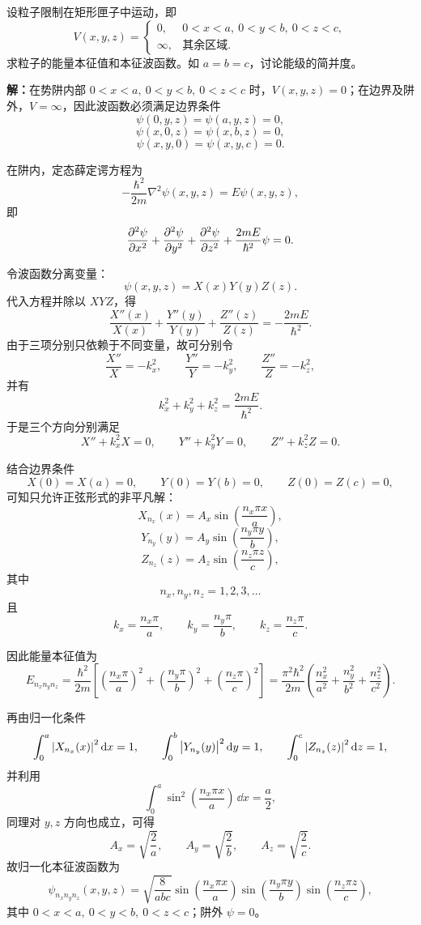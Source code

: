 \documentclass[12pt,a4paper]{article}
\begin{document}
\maketitle

\section{}
设粒子限制在矩形匣子中运动，即
\[
V(x,y,z)=
\begin{cases}
0, & 0<x<a,\ 0<y<b,\ 0<z<c,\\
\infty, & \text{其余区域}.
\end{cases}
\]
求粒子的能量本征值和本征波函数。如 $a=b=c$，讨论能级的简并度。

\vspace{0.5cm}

\noindent\textbf{解：}在势阱内部 $0<x<a,\ 0<y<b,\ 0<z<c$ 时，$V(x,y,z)=0$；在边界及阱外，$V=\infty$，因此波函数必须满足边界条件
\[
\psi(0,y,z)=\psi(a,y,z)=0,
\]
\[
\psi(x,0,z)=\psi(x,b,z)=0,
\]
\[
\psi(x,y,0)=\psi(x,y,c)=0.
\]

在阱内，定态薛定谔方程为
\[
-\frac{\hbar^2}{2m}\nabla^2\psi(x,y,z)=E\psi(x,y,z),
\]
即
\[
\pdv[2]{\psi}{x}+\pdv[2]{\psi}{y}+\pdv[2]{\psi}{z}+\frac{2mE}{\hbar^2}\psi=0.
\]

令波函数分离变量：
\[
\psi(x,y,z)=X(x)Y(y)Z(z).
\]
代入方程并除以 $XYZ$，得
\[
\frac{X''(x)}{X(x)}+\frac{Y''(y)}{Y(y)}+\frac{Z''(z)}{Z(z)}=-\frac{2mE}{\hbar^2}.
\]
由于三项分别只依赖于不同变量，故可分别令
\[
\frac{X''}{X}=-k_x^2,\qquad \frac{Y''}{Y}=-k_y^2,\qquad \frac{Z''}{Z}=-k_z^2,
\]
并有
\[
k_x^2+k_y^2+k_z^2=\frac{2mE}{\hbar^2}.
\]
于是三个方向分别满足
\[
X''+k_x^2X=0,\qquad Y''+k_y^2Y=0,\qquad Z''+k_z^2Z=0.
\]

结合边界条件
\[
X(0)=X(a)=0,\qquad Y(0)=Y(b)=0,\qquad Z(0)=Z(c)=0,
\]
可知只允许正弦形式的非平凡解：
\[
X_{n_x}(x)=A_x\sin\left(\frac{n_x\pi x}{a}\right),
\]
\[
Y_{n_y}(y)=A_y\sin\left(\frac{n_y\pi y}{b}\right),
\]
\[
Z_{n_z}(z)=A_z\sin\left(\frac{n_z\pi z}{c}\right),
\]
其中
\[
n_x,n_y,n_z=1,2,3,\dots
\]
且
\[
k_x=\frac{n_x\pi}{a},\qquad k_y=\frac{n_y\pi}{b},\qquad k_z=\frac{n_z\pi}{c}.
\]

因此能量本征值为
\[
E_{n_xn_yn_z}=\frac{\hbar^2}{2m}\left[\left(\frac{n_x\pi}{a}\right)^2+\left(\frac{n_y\pi}{b}\right)^2+\left(\frac{n_z\pi}{c}\right)^2\right]
=\frac{\pi^2\hbar^2}{2m}\left(\frac{n_x^2}{a^2}+\frac{n_y^2}{b^2}+\frac{n_z^2}{c^2}\right).
\]

再由归一化条件
\[
\int_0^a \abs{X_{n_x}(x)}^2\,\dd x=1,\qquad \int_0^b \abs{Y_{n_y}(y)}^2\,\dd y=1,\qquad \int_0^c \abs{Z_{n_z}(z)}^2\,\dd z=1,
\]
并利用
\[
\int_0^a \sin^2\left(\frac{n_x\pi x}{a}\right)\,\dd x=\frac{a}{2},
\]
同理对 $y,z$ 方向也成立，可得
\[
A_x=\sqrt{\frac{2}{a}},\qquad A_y=\sqrt{\frac{2}{b}},\qquad A_z=\sqrt{\frac{2}{c}}.
\]
故归一化本征波函数为
\[
\psi_{n_xn_yn_z}(x,y,z)=\sqrt{\frac{8}{abc}}\sin\left(\frac{n_x\pi x}{a}\right)\sin\left(\frac{n_y\pi y}{b}\right)\sin\left(\frac{n_z\pi z}{c}\right),
\]
其中 $0<x<a,\ 0<y<b,\ 0<z<c$；阱外 $\psi=0$。
\end{document}
